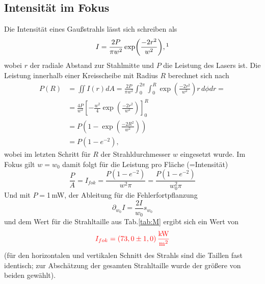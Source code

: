 \subsection{Intensität im Fokus}
Die Intensität eines Gaußstrahls lässt sich schreiben als 
\begin{equation*}
    I = \frac{2P}{\pi w^2} \exp(\frac{-2r^2}{w^2}), \mathrm{\footnotemark}
\end{equation*}
wobei $r$ der radiale Abstand zur Stahlmitte und $P$ die Leistung des Lasers ist. Die Leistung innerhalb einer Kreisscheibe mit Radius $R$ berechnet sich nach 
\begin{align*}
    P(R) &= \iint I(r) dA = \frac{2P}{\pi w^2} \int_0^{2\pi} \int_0^R \exp(\frac{-2r^2}{w^2})r\, d\phi dr = \\
    &= \frac{4P}{w^2} [-\frac{w^2}{4}\exp(\frac{-2r^2}{w^2})]_0^R \\
    &= P (1-\exp(\frac{-2R^2}{w^2}))\\
    &= P(1-e^{-2}),
\end{align*}
wobei im letzten Schritt für $R$ der Strahldurchmesser $w$ eingesetzt wurde. Im Fokus gilt $w = w_0$ damit folgt für die Leistung pro Fläche (=Intensität)
\begin{equation*}
    \frac{P}{A} = I_{fok} = \frac{P(1-e^{-2})}{w^2\pi} = \frac{P(1-e^{-2})}{w_0^2\pi}
\end{equation*}
Und mit $P =$1\,mW, der Ableitung für die Fehlerfortpflanzung 
\begin{equation*}
    \partial_{w_0}I = \frac{2I}{w_0}s_{w_0}
\end{equation*}
und dem Wert für die Strahltaille aus Tab.\ref{tab:M} ergibt sich ein Wert von 
\begin{equation*}
    \textcolor{red}{I_{fok} = (73,0 \pm 1,0)\,\frac{\mathrm{kW}}{\mathrm{m^2}}}
\end{equation*}
(für den horizontalen und vertikalen Schnitt des Strahls sind die Taillen fast identisch; zur Abschätzung der gesamten 
Strahltaille wurde der größere von beiden gewählt).